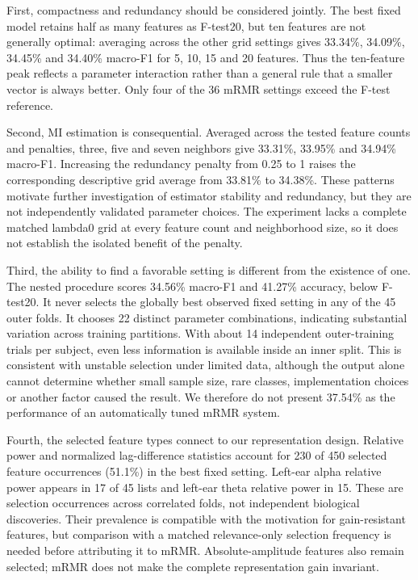 \documentclass[10pt,a4paper]{article}
\begin{document}
First, compactness and redundancy should be considered jointly. The best fixed model retains half as many features as F-test20, but ten features are not generally optimal: averaging across the other grid settings gives 33.34\%, 34.09\%, 34.45\% and 34.40\% macro-F1 for 5, 10, 15 and 20 features. Thus the ten-feature peak reflects a parameter interaction rather than a general rule that a smaller vector is always better. Only four of the 36 mRMR settings exceed the F-test reference.


Second, MI estimation is consequential. Averaged across the tested feature counts and penalties, three, five and seven neighbors give 33.31\%, 33.95\% and 34.94\% macro-F1. Increasing the redundancy penalty from 0.25 to 1 raises the corresponding descriptive grid average from 33.81\% to 34.38\%. These patterns motivate further investigation of estimator stability and redundancy, but they are not independently validated parameter choices. The experiment lacks a complete matched lambda0 grid at every feature count and neighborhood size, so it does not establish the isolated benefit of the penalty.


Third, the ability to find a favorable setting is different from the existence of one. The nested procedure scores 34.56\% macro-F1 and 41.27\% accuracy, below F-test20. It never selects the globally best observed fixed setting in any of the 45 outer folds. It chooses 22 distinct parameter combinations, indicating substantial variation across training partitions. With about 14 independent outer-training trials per subject, even less information is available inside an inner split. This is consistent with unstable selection under limited data, although the output alone cannot determine whether small sample size, rare classes, implementation choices or another factor caused the result. We therefore do not present 37.54\% as the performance of an automatically tuned mRMR system.


Fourth, the selected feature types connect to our representation design. Relative power and normalized lag-difference statistics account for 230 of 450 selected feature occurrences (51.1\%) in the best fixed setting. Left-ear alpha relative power appears in 17 of 45 lists and left-ear theta relative power in 15. These are selection occurrences across correlated folds, not independent biological discoveries. Their prevalence is compatible with the motivation for gain-resistant features, but comparison with a matched relevance-only selection frequency is needed before attributing it to mRMR. Absolute-amplitude features also remain selected; mRMR does not make the complete representation gain invariant.
\end{document}
